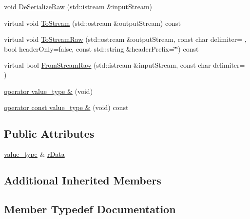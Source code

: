 \begin{DoxyCompactItemize}
void \hyperlink{classmts_generic_object_proxy_ref_a35a8d210a8fdbc6d06707b6c562c4ea3}{De\+Serialize\+Raw} (std\+::istream \&input\+Stream)
\item 
virtual void \hyperlink{classmts_generic_object_proxy_ref_aa3d12378361aadf0810d4a4aadd108ae}{To\+Stream} (std\+::ostream \&output\+Stream) const 
\item 
virtual void \hyperlink{classmts_generic_object_proxy_ref_a1d44d780c6f98b8d3c0e882312b721ad}{To\+Stream\+Raw} (std\+::ostream \&output\+Stream, const char delimiter= \textquotesingle{} \textquotesingle{}, bool header\+Only=false, const std\+::string \&header\+Prefix=\char`\"{}\char`\"{}) const 
\item 
virtual bool \hyperlink{classmts_generic_object_proxy_ref_ac88583dd9d665e1b145e030d44d3b664}{From\+Stream\+Raw} (std\+::istream \&input\+Stream, const char delimiter= \textquotesingle{} \textquotesingle{})
\end{DoxyCompactItemize}
{\bf }\par
\begin{DoxyCompactItemize}
\item 
\hyperlink{classmts_generic_object_proxy_ref_a7c8c9952cd429eaefaf6f5a95188a55a}{operator value\+\_\+type \&} (void)
\item 
\hyperlink{classmts_generic_object_proxy_ref_a04b5d526e3b3c4168d4ad47a255022d8}{operator const value\+\_\+type \&} (void) const 
\end{DoxyCompactItemize}

\subsection*{Public Attributes}
\begin{DoxyCompactItemize}
\item 
\hyperlink{classmts_generic_object_proxy_ref_af50eac4bbf86d9609d7cd77c33d4bf54}{value\+\_\+type} \& \hyperlink{classmts_generic_object_proxy_ref_a588d268b7943faf5949bc201e5ef502a}{r\+Data}
\end{DoxyCompactItemize}
\subsection*{Additional Inherited Members}


\subsection{Member Typedef Documentation}
\hypertarget{classmts_generic_object_proxy_ref_a52a477c15ddc935700cf9fdbe9da0dcf}{}

